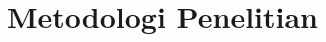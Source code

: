 \documentclass[11pt]{simart} %
\begin{document}


\section{Metodologi Penelitian}

\lipsum[15-19]

%





\end{document}
